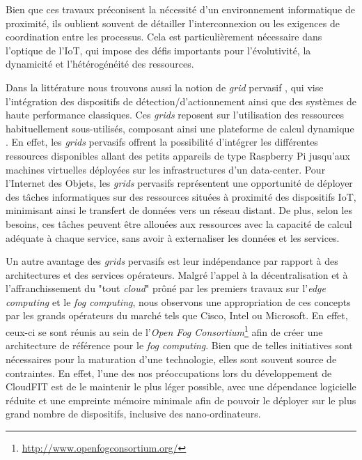 Bien que ces travaux préconisent la nécessité d'un environnement informatique de proximité, ils oublient souvent de détailler l'interconnexion ou les exigences de coordination entre les processus. Cela est particulièrement nécessaire dans l'optique de l'IoT, qui impose des défis importants pour l'évolutivité, la dynamicité et l'hétérogénéité des ressources. 

Dans la littérature nous trouvons aussi la notion de \textit{grid} pervasif \cite{Parashar2010}, qui vise l'intégration des dispositifs de détection/d'actionnement ainsi que des systèmes de haute performance classiques. Ces \textit{grids} reposent sur l'utilisation des ressources habituellement sous-utilisés, composant ainsi une plateforme de calcul dynamique \cite{Steffenel2015Roma}. En effet, les \textit{grids} pervasifs offrent la possibilité d'intégrer les différentes ressources disponibles allant des petits appareils de type Raspberry Pi jusqu'aux machines virtuelles déployées sur les infrastructures d'un data-center. Pour l'Internet des Objets, les \textit{grids} pervasifs représentent une opportunité de déployer des tâches informatiques sur des ressources situées à proximité des dispositifs IoT, minimisant ainsi le transfert de données vers un réseau distant. De plus, selon les besoins, ces tâches peuvent être allouées aux ressources avec la capacité de calcul adéquate à chaque service, sans avoir à externaliser les données et les services.

Un autre avantage des \textit{grids} pervasifs est leur indépendance par rapport à des architectures et des services opérateurs. Malgré l'appel à la décentralisation et à l'affranchissement du "tout \textit{cloud}" prôné par les premiers travaux sur l'\textit{edge computing} et le \textit{fog computing}, nous observons une appropriation de ces concepts par les grands opérateurs du marché tels que Cisco, Intel ou Microsoft. En effet, ceux-ci se sont réunis au sein de l'\textit{Open Fog Consortium}\footnote{\url{http://www.openfogconsortium.org/}} afin de créer une architecture de référence pour le \textit{fog computing}. Bien que de telles initiatives sont nécessaires pour la maturation d'une technologie, elles sont souvent source de contraintes. En effet, l'une des nos préoccupations lors du développement de CloudFIT est de le maintenir le plus léger possible, avec une dépendance logicielle réduite et une empreinte mémoire minimale afin de pouvoir le déployer sur le plus grand nombre de dispositifs, inclusive des nano-ordinateurs.

